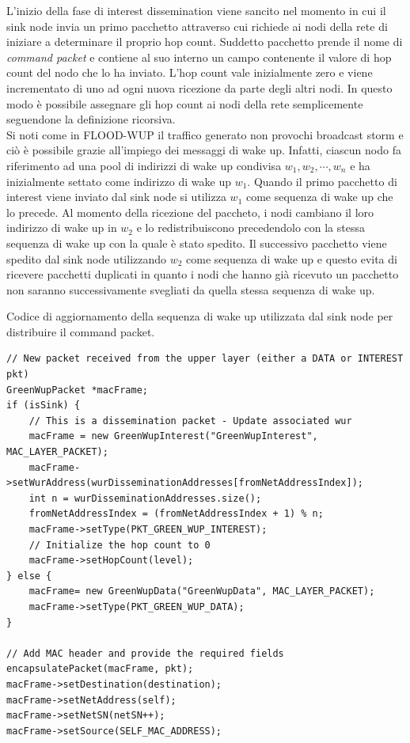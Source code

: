 \documentclass[binding=0.6cm,TFA]{sapthesis}
\begin{document}
L'inizio della fase di interest dissemination viene sancito nel momento in cui il sink node invia un primo pacchetto attraverso cui richiede
ai nodi della rete di iniziare a determinare il proprio hop count. Suddetto pacchetto prende il nome di \emph{command packet} e contiene
al suo interno un campo contenente il valore di hop count del nodo che lo ha inviato. L'hop count vale inizialmente zero 
e viene incrementato di uno ad ogni nuova ricezione da parte degli altri nodi. In questo modo è possibile assegnare gli hop count ai nodi
della rete semplicemente seguendone la definizione ricorsiva.\\

Si noti come in FLOOD-WUP il traffico generato non provochi broadcast storm e ciò è possibile grazie all'impiego dei messaggi
di wake up. Infatti, ciascun nodo fa riferimento ad una pool di indirizzi di wake up condivisa $w_1, w_2, \cdots, w_n$ e ha inizialmente
settato come indirizzo di wake up $w_1$. Quando il primo pacchetto di interest viene inviato dal sink node si utilizza $w_1$ come sequenza
di wake up che lo precede. Al momento della ricezione del paccheto, i nodi cambiano il loro indirizzo di wake up in $w_2$ e lo redistribuiscono
precedendolo con la stessa sequenza di wake up con la quale è stato spedito. Il successivo pacchetto viene spedito dal sink
node utilizzando $w_2$ come sequenza di wake up e questo evita di ricevere pacchetti duplicati in quanto i nodi che hanno già ricevuto un
pacchetto non saranno successivamente svegliati da quella stessa sequenza di wake up.\\

\begin{listing}
    \caption{Codice di aggiornamento della sequenza di wake up utilizzata dal sink node per distribuire il command packet.}
    \begin{verbatim}
// New packet received from the upper layer (either a DATA or INTEREST pkt)
GreenWupPacket *macFrame;
if (isSink) {
    // This is a dissemination packet - Update associated wur
    macFrame = new GreenWupInterest("GreenWupInterest", MAC_LAYER_PACKET);
    macFrame->setWurAddress(wurDisseminationAddresses[fromNetAddressIndex]);
    int n = wurDisseminationAddresses.size();
    fromNetAddressIndex = (fromNetAddressIndex + 1) % n;
    macFrame->setType(PKT_GREEN_WUP_INTEREST);
    // Initialize the hop count to 0
    macFrame->setHopCount(level);
} else {
    macFrame= new GreenWupData("GreenWupData", MAC_LAYER_PACKET);
    macFrame->setType(PKT_GREEN_WUP_DATA);
}

// Add MAC header and provide the required fields
encapsulatePacket(macFrame, pkt);
macFrame->setDestination(destination);
macFrame->setNetAddress(self);
macFrame->setNetSN(netSN++);
macFrame->setSource(SELF_MAC_ADDRESS);

    \end{verbatim}
\end{listing}
\end{document}
